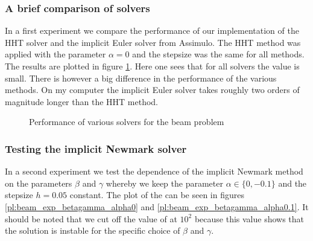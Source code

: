 \documentclass{report}
\newcounter{constant}
\begin{document}
\subsubsection*{A brief comparison of solvers}

In a first experiment we compare the performance of our implementation of the HHT solver and the implicit Euler solver from Assimulo. The HHT method was applied with the parameter $\alpha=0$ and the stepsize was the same for all methods. The results are plotted in figure \ref{tb:beam_exp_solverComparison}. Here one sees that for all solvers the value  is small. There is however a big difference in the performance of the various methods. On my computer the implicit Euler solver takes roughly two orders of magnitude longer than the HHT method.

\begin{figure}[h]
\centering

\caption{Performance of various solvers for the beam problem}
\label{tb:beam_exp_solverComparison}
\end{figure}


\subsubsection*{Testing the implicit Newmark solver}

In a second experiment we test the dependence of the implicit Newmark method on the parameters $\beta$ and $\gamma$ whereby we keep the parameter $\alpha\in\{0,-0.1\}$ and the stepsize $h=0.05$ constant. The plot of the  can be seen in figures  \ref{pl:beam_exp_betagamma_alpha0} and \ref{pl:beam_exp_betagamma_alpha0.1}. It should be noted that we cut off the value of  at $10^2$ because this value shows that the solution is instable for the specific choice of $\beta$ and $\gamma$.
\end{document}
